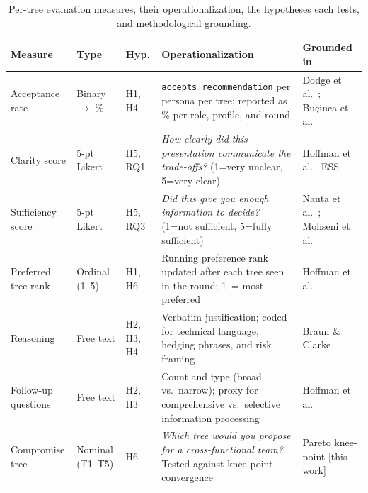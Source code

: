 \documentclass[sigconf,review]{acmart}
\begin{document}
\begin{table}[ht]
  \caption{Per-tree evaluation measures, their operationalization,
           the hypotheses each tests, and methodological grounding.}
  \label{tab:measures}
  \small
  \begin{tabularx}{\textwidth}{lllXl}
    \toprule
    \textbf{Measure} & \textbf{Type} & \textbf{Hyp.} &
    \textbf{Operationalization} & \textbf{Grounded in} \\
    \midrule
    Acceptance rate
      & Binary $\to$ \%
      & H1, H4
      & \texttt{accepts\_recommendation} per persona per tree; reported as \% per role, profile, and round
      & Dodge et al.~\cite{dodge2019explaining};
        Bu\c{c}inca et al.~\cite{bucinca2020proxy} \\
    \addlinespace
    Clarity score
      & 5-pt Likert
      & H5, RQ1
      & \textit{How clearly did this presentation communicate the trade-offs?} (1=very unclear, 5=very clear)
      & Hoffman et al.~\cite{hoffman2023measures} ESS \\
    \addlinespace
    Sufficiency score
      & 5-pt Likert
      & H5, RQ3
      & \textit{Did this give you enough information to decide?} (1=not sufficient, 5=fully sufficient)
      & Nauta et al.~\cite{nauta2023anecdotal};
        Mohseni et al.~\cite{mohseni2021multidisciplinary} \\
    \addlinespace
    Preferred tree rank
      & Ordinal (1--5)
      & H1, H6
      & Running preference rank updated after each tree seen in the round; 1~= most preferred
      & Hoffman et al.~\cite{hoffman2023measures} \\
    \addlinespace
    Reasoning
      & Free text
      & H2, H3, H4
      & Verbatim justification; coded for technical language, hedging phrases, and risk framing
      & Braun \& Clarke~\cite{braun2006using} \\
    \addlinespace
    Follow-up questions
      & Free text
      & H2, H3
      & Count and type (broad vs.\ narrow); proxy for comprehensive vs.\ selective information processing
      & Hoffman et al.~\cite{hoffman2023measures} \\
    \addlinespace
    Compromise tree
      & Nominal (T1--T5)
      & H6
      & \textit{Which tree would you propose for a cross-functional team?} Tested against knee-point convergence
      & Pareto knee-point [this work] \\
    \bottomrule
  \end{tabularx}
\end{table}
\end{document}
